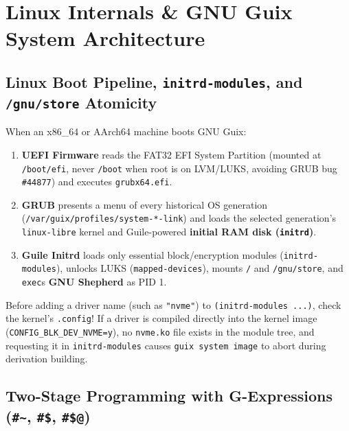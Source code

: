 \documentclass[11pt,oneside]{book}
\begin{document}
\chapter{Linux Internals \& GNU Guix System Architecture}

\section{Linux Boot Pipeline, \texttt{initrd-modules}, and \texttt{/gnu/store} Atomicity}

When an x86\_64 or AArch64 machine boots GNU Guix:
\begin{enumerate}
  \item \textbf{UEFI Firmware} reads the FAT32 EFI System Partition (mounted at \texttt{/boot/efi}, never \texttt{/boot} when root is on LVM/LUKS, avoiding GRUB bug \texttt{\#44877}) and executes \texttt{grubx64.efi}.
  \item \textbf{GRUB} presents a menu of every historical OS generation (\texttt{/var/guix/profiles/system-*-link}) and loads the selected generation's \texttt{linux-libre} kernel and Guile-powered \textbf{initial RAM disk (\texttt{initrd})}.
  \item \textbf{Guile Initrd} loads only essential block/encryption modules (\texttt{initrd-modules}), unlocks LUKS (\texttt{mapped-devices}), mounts \texttt{/} and \texttt{/gnu/store}, and \texttt{exec}s \textbf{GNU Shepherd} as PID 1.
\end{enumerate}

\begin{protrap}[Built-In Kernel Drivers (\texttt{=y}) vs. Loadable Modules (\texttt{=m}) in \texttt{initrd-modules}]
Before adding a driver name (such as \texttt{"nvme"}) to \texttt{(initrd-modules ...)}, check the kernel's \texttt{.config}! If a driver is compiled directly into the kernel image (\texttt{CONFIG\_BLK\_DEV\_NVME=y}), no \texttt{nvme.ko} file exists in the module tree, and requesting it in \texttt{initrd-modules} causes \texttt{guix system image} to abort during derivation building.
\end{protrap}

\section{Two-Stage Programming with G-Expressions (\texttt{\#\textasciitilde}, \texttt{\#\$}, \texttt{\#\$@})}
\end{document}
